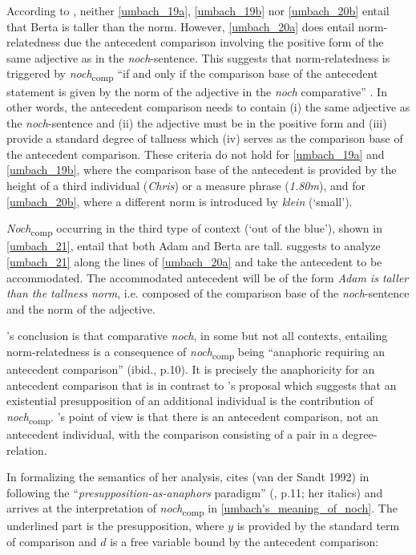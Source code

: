 \documentclass[output=paper,
modfonts
]{langscibook}
\begin{document}
\noindent According to \citet{umbach2009a_comp}, neither \ref{umbach_19a}, \ref{umbach_19b} nor \ref{umbach_20b} entail that Berta is taller than the norm. However, \ref{umbach_20a} does entail norm-relatedness due the antecedent comparison involving the positive form of the same adjective as in the \textit{noch}-sentence. This suggests that norm-relatedness is triggered by \textit{noch}\textsubscript{comp} ``if and only if the comparison base of the antecedent statement is given by the norm of the adjective in the \textit{noch} comparative'' \citep[p.10]{umbach2009a_comp}. In other words, the antecedent comparison needs to contain (i) the same adjective as the \textit{noch}-sentence and (ii) the adjective must be in the positive form and (iii) provide a standard degree of tallness which (iv) serves as the comparison base of the antecedent comparison. These criteria do not hold for \ref{umbach_19a} and \ref{umbach_19b}, where the comparison base of the antecedent is provided by the height of a third individual (\textit{Chris}) or a measure phrase (\textit{1.80m}), and for \ref{umbach_20b}, where a different norm is introduced by \textit{klein} (`small').

\textit{Noch}\textsubscript{comp} occurring in the third type of context (`out of the blue'), shown in \ref{umbach_21}, entail that both Adam and Berta are tall. \citeauthor{umbach2009a_comp} suggests to analyze \ref{umbach_21} along the lines of \ref{umbach_20a} and take the antecedent to be accommodated. The accommodated antecedent will be of the form \textit{Adam is taller than the tallness norm}, i.e. composed of the comparison base of the \textit{noch}-sentence and the norm of the adjective.

\citeauthor{umbach2009a_comp}'s \citeyearpar{umbach2009a_comp} conclusion is that comparative \textit{noch}, in some but not all contexts, entailing norm-relatedness is a consequence of \textit{noch}\textsubscript{comp} being ``anaphoric requiring an antecedent comparison'' (ibid., p.10). It is precisely the anaphoricity for an antecedent comparison that is in contrast to \citeauthor{koenig1977}'s \citeyearpar{koenig1977} proposal which suggests that an existential presupposition of an additional individual is the contribution of \textit{noch}\textsubscript{comp}. \citeauthor{umbach2009a_comp}'s \citeyearpar{umbach2009a_comp} point of view is that there is an antecedent comparison, not an antecedent individual, with the comparison consisting of a pair in a degree-relation.


In formalizing the semantics of her analysis, \citeauthor{umbach2009a_comp} cites (van der Sandt 1992) in following the ``\textit{presupposition-as-anaphors} paradigm'' (\citealt{umbach2009a_comp}, p.11; her italics) and arrives at the interpretation of \textit{noch}\textsubscript{comp} in \ref{umbach's_meaning_of_noch}. The underlined part is the presupposition, where $y$ is provided by the standard term of comparison and $d$ is a free variable bound by the antecedent comparison:
\end{document}
